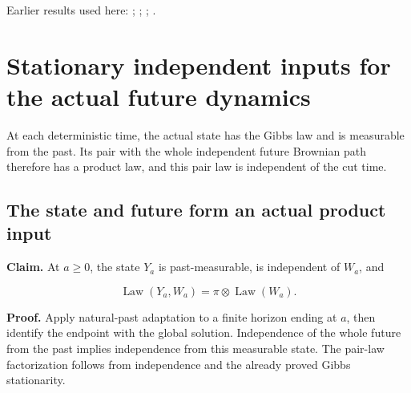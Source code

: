 \documentclass[11pt,a4paper]{report}
\begin{document}
Earlier results used here: \cite[Section~3.22.17]{LangevinLean2026ULASC}; \cite[Section~3.24.8]{LangevinLean2026ULASC}; \cite[Section~3.54.4]{LangevinLean2026ULASC}; \cite[Section~3.8.17]{LangevinLean2026ULASC}.
\section{\texorpdfstring{Stationary independent inputs for the actual future dynamics}{Stationary independent inputs for the actual future dynamics}}
\label{proof-module-WassersteinMixing-ActualMarkovInput-lean}


At each deterministic time, the actual state has the Gibbs law and is measurable from the past. Its pair with the whole independent future Brownian path therefore has a product law, and this pair law is independent of the cut time.

\subsection{\texorpdfstring{The state and future form an actual product input}{The state and future form an actual product input}}
\label{report-step-WassersteinMixing-ActualMarkovInput-lean-1}


\textbf{Claim.} At \(a\ge0\), the state \(Y_a\) is past-measurable, is independent of \(W_a\), and

\[\operatorname{Law}(Y_a,W_a)=\pi\otimes\operatorname{Law}(W_a).\]

\textbf{Proof.} Apply natural-past adaptation to a finite horizon ending at \(a\), then identify the endpoint with the global solution. Independence of the whole future from the past implies independence from this measurable state. The pair-law factorization follows from independence and the already proved Gibbs stationarity.
\end{document}
